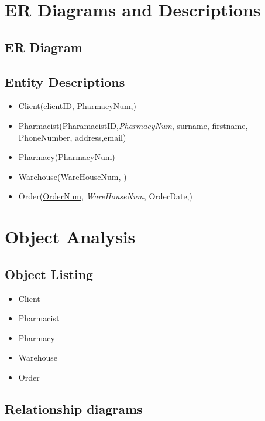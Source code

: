 \section{ER Diagrams and Descriptions}

\subsection{ER Diagram}

\subsection{Entity Descriptions}
\begin{itemize}

\item Client(\underline{clientID}, PharmacyNum,)

\item Pharmacist(\underline{PharamacistID},\emph{PharmacyNum}, surname, firstname, PhoneNumber, address,email)

\item Pharmacy(\underline{PharmacyNum})

\item Warehouse(\underline{WareHouseNum}, )

\item Order(\underline{OrderNum}, \emph{WareHouseNum}, OrderDate,)
\end{itemize}
\section{Object Analysis}

\subsection{Object Listing}
\begin{itemize}

\item Client
\item Pharmacist
\item Pharmacy
\item Warehouse
\item Order

\end{itemize}
\subsection{Relationship diagrams}

